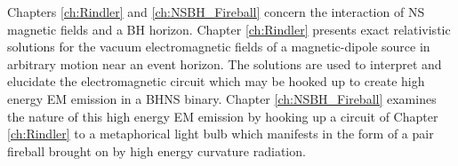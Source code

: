 Chapters \ref{ch:Rindler} and \ref{ch:NSBH_Fireball} concern the interaction
of NS magnetic fields and a BH horizon. Chapter \ref{ch:Rindler}  presents
exact relativistic solutions for the vacuum electromagnetic fields of a
magnetic-dipole source in arbitrary motion near an event horizon. The
solutions are used to interpret and elucidate the electromagnetic circuit
which may be hooked up to create high energy EM emission in a BHNS binary.
Chapter \ref{ch:NSBH_Fireball} examines the nature of this high energy EM
emission by hooking up a circuit of Chapter \ref{ch:Rindler} to a metaphorical
light bulb which manifests in the form of a pair fireball brought on by high
energy curvature radiation.

























